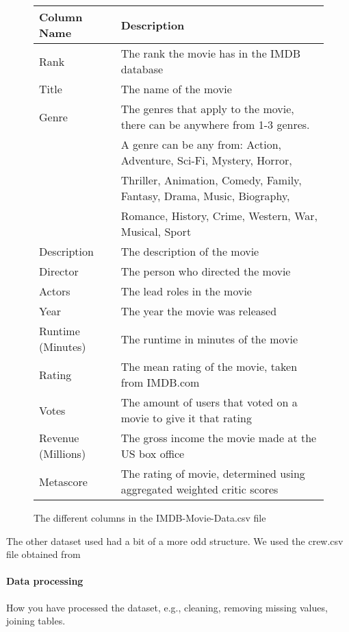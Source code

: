        \begin{figure}[h]
            \centering
            \begin{tabular}{ll}
                \toprule
                Column Name &           Description \\
                \midrule
                Rank &                  The rank the movie has in the IMDB database \\
                Title &                 The name of the movie \\
                Genre &                 The genres that apply to the movie, there can be anywhere from 1-3 genres. \\
                {}      &               A genre can be any from: Action, Adventure, Sci-Fi, Mystery, Horror,       \\
                {}      &               Thriller, Animation, Comedy, Family, Fantasy, Drama, Music, Biography,     \\
                {}      &               Romance, History, Crime, Western, War, Musical, Sport                      \\
                Description &           The description of the movie \\
                Director &              The person who directed the movie \\
                Actors &                The lead roles in the movie \\
                Year  &                 The year the movie was released \\
                Runtime (Minutes) &     The runtime in minutes of the movie \\ 
                Rating   &              The mean rating of the movie, taken from IMDB.com \\
                Votes   &               The amount of users that voted on a movie to give it that rating \\ 
                Revenue (Millions) &    The gross income the movie made at the US box office\\  
                Metascore   &           The rating of movie, determined using aggregated weighted critic scores \\ 
                \bottomrule
            \end{tabular}
            \caption[short]{The different columns in the IMDB-Movie-Data.csv file}\label{fig-IMDB-Movie-Data-Column-Description}
        \end{figure}
        The other dataset used had a bit of a more odd structure.
        We used the crew.csv file obtained from 


    \paragraph{Data processing}
        How you have processed the dataset, e.g., cleaning, removing missing values,
            joining tables.
